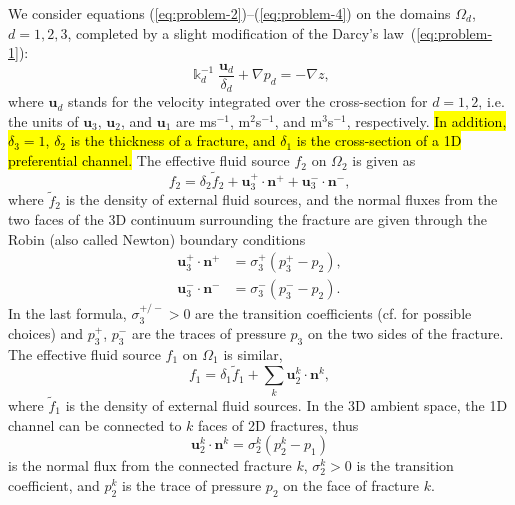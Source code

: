 We consider equations (\ref{eq:problem-2})--(\ref{eq:problem-4}) on the domains
$\Omega_{d}$, $d=1,2,3$, completed by a slight modification of the Darcy's
law~(\ref{eq:problem-1}):
\begin{equation}
\label{eq:darcy-law-fracture}
\Bbbk_{d}^{-1}\frac{\mathbf{u}_{d}}{\delta_{d}}+\nabla p_{d}=-\nabla z,
\end{equation}
where $\mathbf{u}_{d}$ stands for the 
velocity integrated over the cross-section for $d=1,2$,
i.e. the units of $\mathbf{u}_{3}$, $\mathbf{u}_{2}$, and $\mathbf{u}_{1}$ are ms$^{-1}$, m$^{2}$s$^{-1}$, and m$^{3}$s$^{-1}$, respectively.
\hl{In addition, $\delta_{3}=1$, $\delta_{2}$ is the thickness of a fracture, and $\delta_{1}$ is the cross-section of a 1D preferential channel.}
The effective fluid source $f_{2}$
on $\Omega_{2}$ is given as
\begin{equation}
\label{eq:comm-term-2}
f_{2}=\delta_{2}\tilde{f}_{2}+\mathbf{u}_{3}^{+}\cdot\mathbf{n}^{+}%
+\mathbf{u}_{3}^{-}\cdot\mathbf{n}^{-},
\end{equation}
where 
$\tilde{f}_{2}$ is the
density of external fluid sources, and the normal fluxes from the two faces of the
3D continuum surrounding the fracture are given through the Robin (also called
Newton) boundary conditions
\begin{align}
\mathbf{u}_{3}^{+}\cdot\mathbf{n}^{+}  &  =\sigma_{3}^{+}(p_{3}^{+}%
-p_{2}),\label{eq:newton-1}\\
\mathbf{u}_{3}^{-}\cdot\mathbf{n}^{-}  &  =\sigma_{3}^{-}(p_{3}^{-}-p_{2}).
\label{eq:newton-2}%
\end{align}
In the last formula, $\sigma_{3}^{+/-}>0$ are the transition coefficients (cf.
\cite{Martin-2005-MFB} for possible choices) and $p_{3}^{+}$, $p_{3}^{-}$ are
the traces of pressure $p_{3}$ on the two sides of the fracture. The effective
fluid source $f_{1}$ on $\Omega_{1}$ is similar,
\begin{equation}
\label{eq:comm-term-1}
f_{1}=\delta_{1}\tilde{f}_{1}+\sum_{k}\mathbf{u}_{2}^{k}\cdot\mathbf{n}^{k},
\end{equation}
where 
$\tilde{f}_{1}$ is the density of external fluid sources. In the 3D ambient
space, the 1D channel can be connected to $k$ faces of 2D fractures, thus
\begin{equation}
\mathbf{u}_{2}^{k}\cdot\mathbf{n}^{k}=\sigma_{2}^{k}(p_{2}^{k}-p_{1})
\label{eq:newton-3}%
\end{equation}
is the normal flux from the connected fracture $k$, $\sigma_{2}^{k}>0$ is the transition
coefficient, and $p_{2}^{k}$ is the trace of pressure $p_{2}$ on the face of
fracture $k$.

